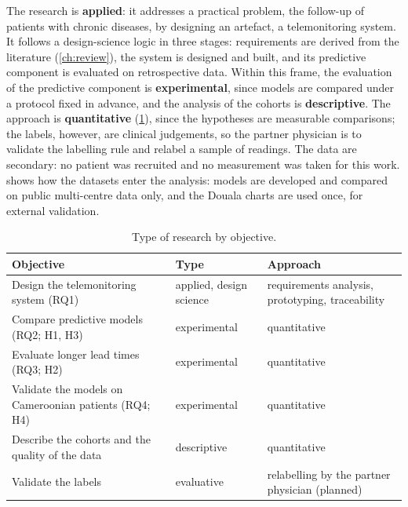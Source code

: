 The research is \textbf{applied}: it addresses a practical problem, the follow-up of patients with chronic diseases, by designing an artefact, a telemonitoring system. It follows a design-science logic in three stages: requirements are derived from the literature (\cref{ch:review}), the system is designed and built, and its predictive component is evaluated on retrospective data. Within this frame, the evaluation of the predictive component is \textbf{experimental}, since models are compared under a protocol fixed in advance, and the analysis of the cohorts is \textbf{descriptive}. The approach is \textbf{quantitative} (\cref{tab:research-type}), since the hypotheses are measurable comparisons; the labels, however, are clinical judgements, so the partner physician is to validate the labelling rule and relabel a sample of readings. The data are secondary: no patient was recruited and no measurement was taken for this work.  shows how the datasets enter the analysis: models are developed and compared on public multi-centre data only, and the Douala charts are used once, for external validation.

\begin{table}[htbp]
\centering\small
\caption{Type of research by objective.}\label{tab:research-type}
\begin{tabularx}{\textwidth}{@{}X >{\raggedright\arraybackslash}p{3.0cm} >{\raggedright\arraybackslash}p{3.8cm}@{}}
\toprule
\textbf{Objective} & \textbf{Type} & \textbf{Approach} \\
\midrule
Design the telemonitoring system (RQ1) & applied, design science & requirements analysis, prototyping, traceability \\
Compare predictive models (RQ2; H1, H3) & experimental & quantitative \\
Evaluate longer lead times (RQ3; H2) & experimental & quantitative \\
Validate the models on Cameroonian patients (RQ4; H4) & experimental & quantitative \\
Describe the cohorts and the quality of the data & descriptive & quantitative \\
Validate the labels & evaluative & relabelling by the partner physician (planned) \\
\bottomrule
\end{tabularx}
\end{table}

